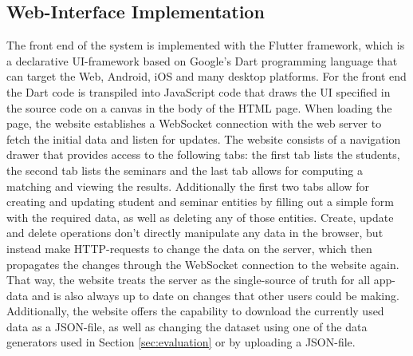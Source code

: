 \subsection{Web-Interface Implementation}
The front end of the system is implemented with the Flutter framework, which is a declarative UI-framework based on Google's Dart programming language that can target the Web, Android, iOS and many desktop platforms. For the front end the Dart code is transpiled into JavaScript code that draws the UI specified in the source code on a canvas in the body of the HTML page. When loading the page, the website establishes a WebSocket connection with the web server to fetch the initial data and listen for updates. 
The website consists of a navigation drawer that provides access to the following tabs: the first tab lists the students, the second tab lists the seminars and the last tab allows for computing a matching and viewing the results. Additionally the first two tabs allow for creating and updating student and seminar entities by filling out a simple form with the required data, as well as deleting any of those entities. Create, update and delete operations don't directly manipulate any data in the browser, but instead make HTTP-requests to change the data on the server, which then propagates the changes through the WebSocket connection to the website again. That way, the website treats the server as the single-source of truth for all app-data and is also always up to date on changes that other users could be making. Additionally, the website offers the capability to download the currently used data as a JSON-file, as well as changing the dataset using one of the data generators used in Section \ref{sec:evaluation} or by uploading a JSON-file.
